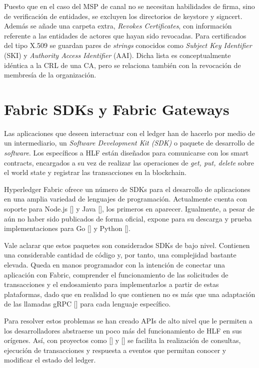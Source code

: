 Puesto que en el caso del MSP de canal no se necesitan habilidades de firma, sino de verificaci\'on de entidades, se excluyen los directorios de keystore y signcert. Adem\'as se a\~nade una carpeta extra, \emph{Revokes Certificates}, con informaci\'on referente a las entidades de actores que hayan sido revocadas. Para certificados del tipo X.509 se guardan pares de \emph{strings} conocidos como \emph{Subject Key Identifier} (SKI) y \emph{Authority Access Identifier} (AAI). Dicha lista es conceptualmente id\'entica a la CRL de una CA, pero se relaciona tambi\'en con la revocaci\'on de membres\'ia de la organizaci\'on.


\section{Fabric SDKs y Fabric Gateways} 

Las aplicaciones que deseen interactuar con el ledger han de hacerlo por medio de un intermediario, un \emph{Software Development Kit (SDK)} o paquete de desarrollo de \emph{software}. Los espec\'ificos a HLF est\'an dise\~nados para comunicarse con los smart contracts, encargados a su vez de realizar las operaciones de \emph{get, put, delete} sobre el world state y registrar las transacciones en la blockchain.%

Hyperledger Fabric ofrece un n\'umero de SDKs para el desarrollo de aplicaciones en una amplia variedad de lenguajes de programaci\'on. Actualmente cuenta con soporte para Node.js [\cite{sdknode}] y Java [\cite{sdkjava}], los primeros en aparecer. Igualmente, a pesar de a\'un no haber sido publicados de forma oficial, expone para su descarga y prueba implementaciones para Go [\cite{sdkgo}] y Python [\cite{sdkpython}].

Vale aclarar que estos paquetes son considerados SDKs de bajo nivel. Contienen una considerable cantidad de c\'odigo y, por tanto, una complejidad bastante elevada. Queda en manos programador con la intenci\'on de conectar una aplicaci\'on con Fabric, comprender el funcionamiento de las solicitudes de transacciones y el endosamiento para implementarlos a partir de estas plataformas, dado que en realidad lo que contienen no es m\'as que una adaptaci\'on de las llamadas gRPC [\cite{grpc}] para cada lenguaje espec\'ifico.

Para resolver estos problemas se han creado APIs de alto nivel que le permiten a los desarrolladores abstraerse un poco m\'as del funcionamiento de HLF en sus or\'igenes. As\'i, con proyectos como [\cite{fabricgateway}] y [\cite{fabricgatewayjava}] se facilita la realizaci\'on de consultas, ejecuci\'on de transacciones y respuesta a eventos que permitan conocer y modificar el estado del ledger.

